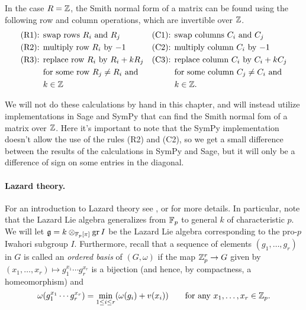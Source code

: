 \begin{remark}
  In the case $R = \mathbb{Z}$, the Smith normal form of a matrix can be found using the following row and column operations, which are invertible over $\mathbb{Z}$.
  \begin{align*}
    \text{(R1): } & \text{swap rows $R_{i}$ and $R_{j}$} & \text{(C1): } & \text{swap columns $C_{i}$ and $C_{j}$} \\
    \text{(R2): } & \text{multiply row $R_{i}$ by $-1$} & \text{(C2): } & \text{multiply column $C_{i}$ by $-1$} \\
    \text{(R3): } & \text{replace row $R_{i}$ by $R_{i} + kR_{j}$} & \text{(C3): } & \text{replace column $C_{i}$ by $C_{i} + kC_{j}$} \\
                  & \text{for some row $R_{j} \neq R_{i}$ and} && \text{for some column $C_{j} \neq C_{i}$ and} \\
    & k\in\mathbb{Z} && k\in\mathbb{Z}.
  \end{align*}

  \noindent We will not do these calculations by hand in this chapter, and will instead utilize implementations in Sage and SymPy that can find the Smith normal fom of a matrix over $\mathbb{Z}$. Here it's important to note that the SymPy implementation doesn't allow the use of the rules (R2) and (C2), so we get a small difference between the results of the calculations in SymPy and Sage, but it will only be a difference of sign on some entries in the diagonal.
\end{remark}

\paragraph{Lazard theory.} For an introduction to Lazard theory see , or \cite{Sch} for more details. In particular, note that the Lazard Lie algebra generalizes from $\mathbb{F}_{p}$ to general $k$ of characteristic $p$. We will let $\mathfrak{g} = k \otimes_{\mathbb{F}_p[\pi]} \operatorname{gr} I$ be the Lazard Lie algebra corresponding to the pro-$p$ Iwahori subgroup $I$. Furthermore, recall that a sequence of elements $(g_1,\dotsc,g_r)$ in $G$ is called an \emph{ordered basis} of $(G,\omega)$ if the map $\mathbb{Z}_{p}^{r} \to G$ given by $(x_{1},\dotsc,x_{r}) \mapsto g_{1}^{x_{1}} \dotsb g_{r}^{x_{r}}$ is a bijection (and hence, by compactness, a homeomorphism) and
\begin{equation*}
  \omega(g_1^{x_1}\dotsb g_r^{x_r}) = \min_{1 \leq i \leq r}(\omega(g_i)+v(x_i)) \qquad \text{for any } x_1,\dotsc,x_r\in\mathbb{Z}_p.
\end{equation*}


